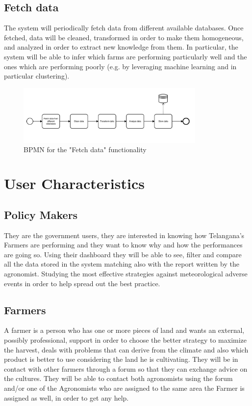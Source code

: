 \documentclass[10pt]{report}
\begin{document}
\subsection{Fetch data}
The system will periodically fetch data from different available databases. Once fetched, data will be cleaned, transformed in order to make them homogeneous, and analyzed in order to extract new knowledge from them. In particular, the system will be able to infer which farms are performing particularly well and the ones which are performing poorly (e.g. by leveraging machine learning and in particular clustering).
\begin{figure}[H]
    \centering
    \includegraphics[width=350px]{BPMN/BPMN 2210.png}
    \caption{BPMN for the "Fetch data" functionality}
\end{figure}
\section{User Characteristics}
\subsection{Policy Makers}
They are the government users, they are interested in knowing how Telangana’s Farmers are performing and they want to know why and how the performances are going so. Using their dashboard they will be able to see, filter and compare all the data stored in the system matching also with the report written by the agronomist. Studying the most effective strategies against meteorological adverse events in order to help spread out the best practice.

\subsection{Farmers}
A farmer is a person who has one or more pieces of land and wants an external, possibly professional, support in order to choose the better strategy to maximize the harvest, deals with problems that can derive from the climate and also which product is better to use considering the land he is cultivating. They will be in contact with other farmers through a forum so that they can exchange advice on the cultures. 
They will be able to contact both agronomists using the forum and/or one of the Agronomists who are assigned to the same area the Farmer is assigned as well, in order to get any help. 
\end{document}

